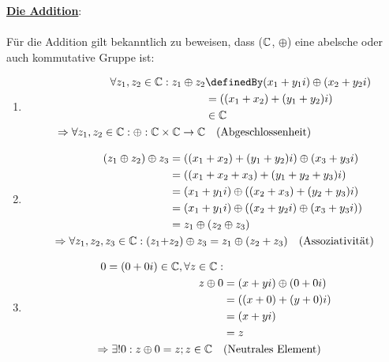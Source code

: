 \documentclass[main.tex]{subfiles}
\begin{document}
	\begin{Beweis}
		\underline{\textbf{Die Addition}}:

		\paragraph{} Für die Addition gilt bekanntlich zu beweisen, dass ($\mathbb{C}$, $\oplus$) eine abelsche oder auch kommutative Gruppe ist:

		\begin{enumerate}[1)]
			\item \begin{align*}
						\forall z_1, z_2 \in \C: z_1 \oplus z_2 &\definedBy (x_1 + y_1i) \oplus (x_2 + y_2i) \\
														   		&= ((x_1 + x_2) + (y_1 + y_2)i) \\
														   		&\in \C \\
						\Rightarrow \forall z_1, z_2 \in \C: \oplus : \C \times \C \rightarrow \C & \quad \text{(Abgeschlossenheit)}
				  \end{align*}
			\item \begin{align*}
				  		(z_1 \oplus z_2) \oplus z_3 &= ((x_1 + x_2) + (y_1 + y_2)i) \oplus (x_3 + y_3i) \\
										  			&= ((x_1 + x_2 + x_3) + (y_1 + y_2 + y_3)i) \\
												    &= (x_1 + y_1i) \oplus ((x_2 + x_3) + (y_2 + y_3)i) \\
												    &= (x_1 + y_1i) \oplus ((x_2 + y_2i) \oplus (x_3 + y_3i)) \\
												    &= z_1 \oplus (z_2 \oplus z_3) \\
						\Rightarrow \forall z_1, z_2, z_3 \in \mathbb{C}: (z_1 + &z_2) \oplus  z_3 = z_1 \oplus (z_2 + z_3) \quad \text{(Assoziativität)}
				  \end{align*}
			\item \begin{align*}
						0 = (0 + 0i) \in \mathbb{C}, \forall z \in \mathbb{C}:& \\
												   z \oplus 0 &= (x + yi) \oplus (0 + 0i) \\
													  		  &= ((x + 0) + (y + 0)i) \\
															  &= (x + yi) \\
															  &= z \\
						\Rightarrow \exists! 0: z \oplus 0 = z; z \in \mathbb{C} \quad &\text{(Neutrales Element)}
				  \end{align*}

\end{enumerate}
\end{Beweis}
\end{document}
